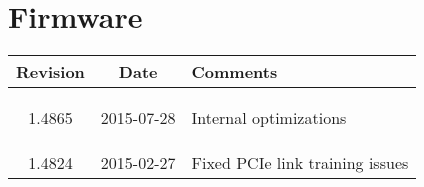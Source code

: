\section{Firmware}
\begin{tabularx}{\textwidth}{|c|c|X|}
    \hline
    Revision & Date & Comments\\
    \hline\hline
    \hypertarget{fwrev}{1.4865} & 2015-07-28 & Internal optimizations\\
    \hline
    1.4824 & 2015-02-27 & Fixed PCIe link training issues\\
    \hline
\end{tabularx}